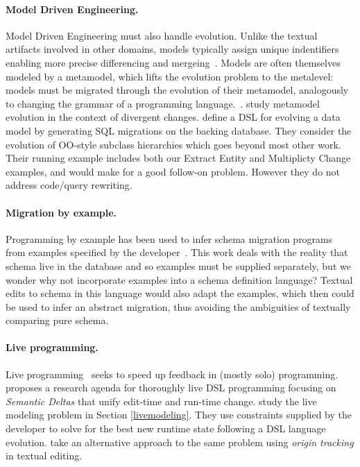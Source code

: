 \documentclass[english,submission]{programming}
\begin{document}
\paragraph{Model Driven Engineering.}
Model Driven Engineering must also handle evolution. Unlike the textual artifacts involved in other domains, models typically assign unique indentifiers enabling more precise differencing and mergeing~\cite{alanen2003}.
Models are often themselves modeled by a metamodel, which lifts the evolution problem to the metalevel: models must be migrated through the evolution of their metamodel, analogously to changing the grammar of a programming language.~\cite{Herrmannsdoerfer11}. \citet{Cicchetti11} study metamodel evolution in the context of divergent changes.
\citet{vermolen11} define a DSL for evolving a data model by generating SQL migrations on the backing database. They consider the evolution of OO-style subclass hierarchies which goes beyond most other work. Their running example includes both our Extract Entity and Multiplicty Change examples, and would make for a good follow-on problem. However they do not address code/query rewriting.

\paragraph{Migration by example.}
Programming by example has been used to infer schema migration programs from examples specified by the developer~\cite{wang20, Alexe11}.
This work deals with the reality that schema live in the database and so examples must be supplied separately, but we wonder why not incorporate examples into a schema definition language? Textual edits to schema in this language would also adapt the examples, which then could be used to infer an abstract migration, thus avoiding the ambiguities of textually comparing pure schema.

\paragraph{Live programming.}
Live programming~\cite{tanimoto90, rein2018exploratory} seeks to speed up feedback in (mostly solo) programming.
\citet{SemanticDeltas} proposes a research agenda for thoroughly live DSL programming focusing on \emph{Semantic Deltas} that unify edit-time and run-time change.
\citet{RuntimeConstraint} study the live modeling problem in Section \ref{livemodeling}. They use constraints supplied by the developer to solve for the best new runtime state following a DSL language evolution. \citet{vanRozen19} take an alternative approach to the same problem using \emph{origin tracking} in textual editing.
\end{document}
